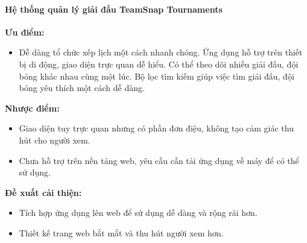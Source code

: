 \paragraph{Hệ thống quản lý giải đấu TeamSnap Tournaments}\mbox{}

\textbf{Ưu điểm:}
\begin{itemize}[itemindent=1cm]
  \item
        Dễ dàng tổ chức xếp lịch một cách nhanh chóng.
        Ứng dụng hỗ trợ trên thiết bị di động, giao diện trực quan dễ hiểu.
        Có thể theo dõi nhiều giải đấu, đội bóng khác nhau cùng một lúc.
        Bộ lọc tìm kiếm giúp việc tìm giải đấu, đội bóng yêu thích một cách dễ dàng.

\end{itemize}

\textbf{Nhược điểm:}
\begin{itemize}[itemindent=1cm]
  \item Giao diện tuy trực quan nhưng có phần đơn điệu, không tạo cảm giác thu hút cho người xem.
  \item Chưa hỗ trợ trên nền tảng web, yêu cầu cần tải ứng dụng về máy để có thể sử dụng.
\end{itemize}

\textbf{Đề xuất cải thiện:}
\begin{itemize} [itemindent=1cm]
  \item Tích hợp ứng dụng lên web để sử dụng dễ dàng và rộng rãi hơn.
  \item Thiết kế trang web bắt mắt và thu hút người xem hơn.
\end{itemize}
